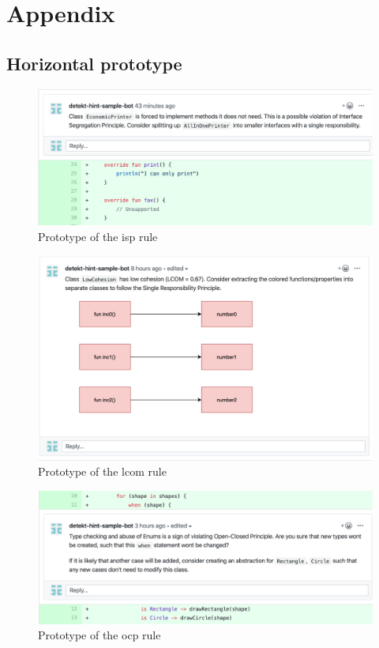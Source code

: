 \clearpage
\section{Appendix}

\subsection{Horizontal prototype}
\label{horizontal-prototype}

\begin{figure}[h!]
    \centering
    \includegraphics[width=\textwidth]{../comment_isp.png}
    \caption{Prototype of the \gls{isp} rule }
    \label{fig:isp}
\end{figure}


\begin{figure}[h!]
    \centering
    \includegraphics[width=\textwidth]{../comment_lackOfCohesion.png}
    \caption{Prototype of the \gls{lcom} rule}
    \label{fig:lcom}
\end{figure}


\begin{figure}[h!]
    \centering
    \includegraphics[width=\textwidth]{../comment_ocp.png}
    \caption{Prototype of the \gls{ocp} rule}
    \label{fig:ocp}
\end{figure}


